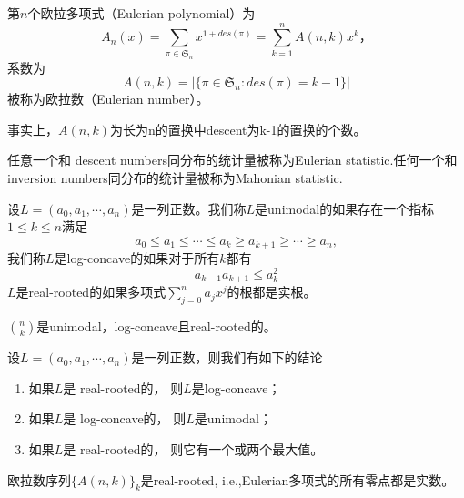 \begin{definition}
	第$n$个欧拉多项式（Eulerian polynomial）为
	\begin{equation*}
		A_n(x) = \sum\limits_{\pi\in \mathfrak S_n}x^{1+des(\pi)} = \sum\limits_{k=1}^nA(n, k)x^k，
	\end{equation*}
	系数为
	\begin{equation*}
		A(n, k) = |\{\pi\in\mathfrak S_n : des(\pi) = k-1\}|
	\end{equation*}
	被称为欧拉数（Eulerian number）。
\end{definition}
\begin{note}
	事实上，$A(n, k)$为长为n的置换中descent为k-1的置换的个数。
\end{note}
\begin{definition}
	任意一个和
descent numbers同分布的统计量被称为Eulerian statistic.任何一个和 inversion numbers同分布的统计量被称为Mahonian statistic.
\end{definition}
\begin{definition}
	设$L = (a_0, a_1, \cdots, a_n)$是一列正数。我们称$L$是unimodal的如果存在一个指标$1\leq k\leq n$满足
	\begin{equation*}
		a_0\leq a_1\leq \cdots \leq a_k \geq a_{k+1}\geq \cdots \geq a_n,
	\end{equation*}
	我们称$L$是log-concave的如果对于所有$k$都有
	\begin{equation*}
		a_{k-1}a_{k+1}\leq a_k^2
	\end{equation*}
	$L$是real-rooted的如果多项式$\sum\limits_{j=0}^na_jx^j$的根都是实根。
\end{definition}
\begin{example}
	$\binom{n}{k}$是unimodal，log-concave且real-rooted的。
\end{example}
\begin{theorem}
	设$L = (a_0, a_1, \cdots, a_n)$是一列正数，则我们有如下的结论
	\begin{enumerate}
		\item 如果$L$是 real-rooted的， 则$L$是log-concave；
		\item 如果$L$是 log-concave的， 则$L$是unimodal；
		\item 如果$L$是 real-rooted的， 则它有一个或两个最大值。
	\end{enumerate}
\end{theorem}
\begin{theorem}
	 欧拉数序列$\{A(n, k)\}_k$是real-rooted, i.e.,Eulerian多项式的所有零点都是实数。
\end{theorem}
